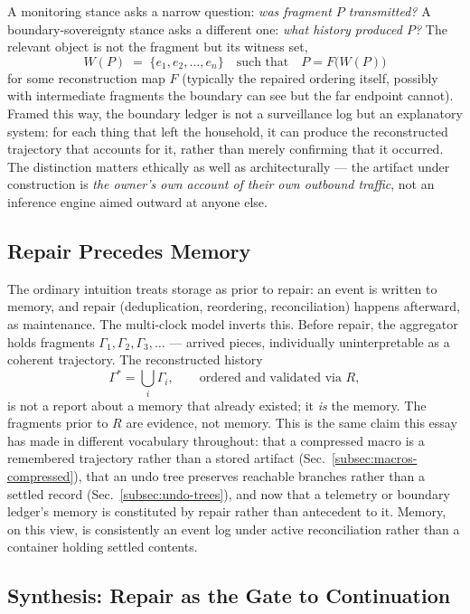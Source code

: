 \documentclass[12pt,a4paper]{article}
\theoremstyle{plain}
\theoremstyle{definition}
\theoremstyle{remark}
\begin{document}
A monitoring stance asks a narrow question: \emph{was fragment $P$ transmitted?} A boundary-sovereignty stance asks a different one: \emph{what history produced $P$?} The relevant object is not the fragment but its witness set,
\[
W(P) \;=\; \{e_1, e_2, \ldots, e_n\} \quad \text{such that} \quad P = F\big(W(P)\big)
\]
for some reconstruction map $F$ (typically the repaired ordering itself, possibly with intermediate fragments the boundary can see but the far endpoint cannot). Framed this way, the boundary ledger is not a surveillance log but an explanatory system: for each thing that left the household, it can produce the reconstructed trajectory that accounts for it, rather than merely confirming that it occurred. The distinction matters ethically as well as architecturally — the artifact under construction is \emph{the owner's own account of their own outbound traffic}, not an inference engine aimed outward at anyone else.

\subsection{Repair Precedes Memory}
\label{subsec:repair-precedes-memory}

The ordinary intuition treats storage as prior to repair: an event is written to memory, and repair (deduplication, reordering, reconciliation) happens afterward, as maintenance. The multi-clock model inverts this. Before repair, the aggregator holds fragments $\Gamma_1, \Gamma_2, \Gamma_3, \ldots$ — arrived pieces, individually uninterpretable as a coherent trajectory. The reconstructed history
\[
\Gamma^{*} = \bigcup_i \Gamma_i, \qquad \text{ordered and validated via } R,
\]
is not a report about a memory that already existed; it \emph{is} the memory. The fragments prior to $R$ are evidence, not memory. This is the same claim this essay has made in different vocabulary throughout: that a compressed macro is a remembered trajectory rather than a stored artifact (Sec.~\ref{subsec:macros-compressed}), that an undo tree preserves reachable branches rather than a settled record (Sec.~\ref{subsec:undo-trees}), and now that a telemetry or boundary ledger's memory is constituted by repair rather than antecedent to it. Memory, on this view, is consistently an event log under active reconciliation rather than a container holding settled contents.

\subsection{Synthesis: Repair as the Gate to Continuation}
\label{subsec:repair-admissibility}
\end{document}
